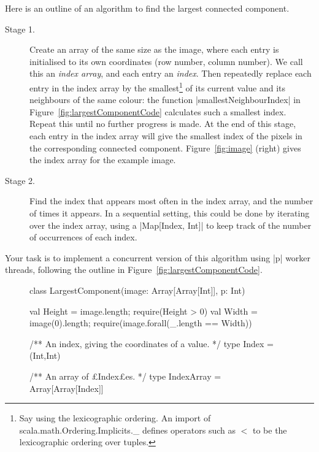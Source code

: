 \begin{question}
Here is an outline of an algorithm to find  the largest connected
component.  
%
\begin{description}
\item[Stage 1.] Create an array of the same size as the image, where each
  entry is initialised to its own coordinates (row number, column number).  We
  call this an \emph{index array}, and each entry an \emph{index}.  Then
  repeatedly replace each entry in the index array by the
  smallest\footnote{Say using the lexicographic ordering.  An import of
    {\scalashape scala.math.Ordering.Implicits.\_} defines operators such as
    $<$ to be the lexicographic ordering over tuples.} of its current value
  and its neighbours of the same colour: the function |smallestNeighbourIndex|
  in Figure~\ref{fig:largestComponentCode} calculates such a smallest index.
  Repeat this until no further progress is made.  At the end of this stage,
  each entry in the index array will give the smallest index of the pixels in
  the corresponding connected component.  Figure~\ref{fig:image} (right) gives
  the index array for the example image.

\item[Stage 2.] Find the index that appears most often in the index array, and
  the number of times it appears.  In a sequential setting, this could be done
  by iterating over the index array, using a |Map[Index, Int]| to keep track
  of the number of occurrences of each index.
\end{description}

Your task is to implement a concurrent version of this algorithm using |p|
worker threads, following the outline in
Figure~\ref{fig:largestComponentCode}.


\begin{figure}[t]
\begin{scala}
class LargestComponent(image: Array[Array[Int]], p: Int){
  val Height = image.length; require(Height > 0)
  val Width = image(0).length; require(image.forall(_.length == Width))

  /** An index, giving the coordinates of a value. */
  type Index = (Int,Int)

  /** An array of £Index£es. */
  type IndexArray = Array[Array[Index]]

}
\end{scala}
\end{figure}
\end{question}
